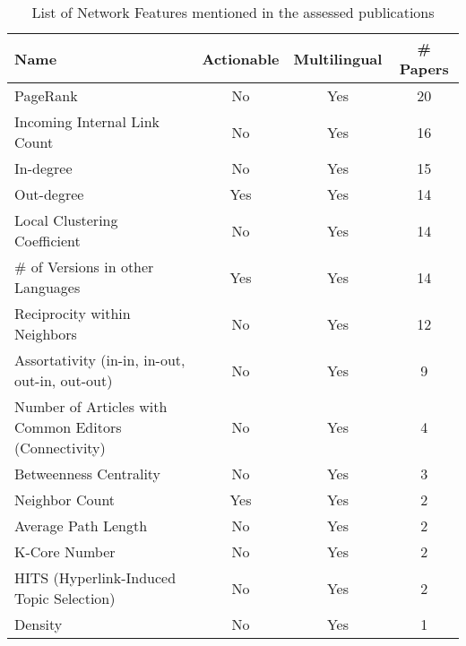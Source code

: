 \begin{table}[htbp]
    \caption{List of Network Features mentioned in the assessed publications}
    \label{tab:feat_Network}
    \centering
    \begin{tabular}{m{} c c c}
        \toprule
        \textbf{Name} & \textbf{Actionable} & \textbf{Multilingual} & \textbf{\# Papers} \\ 
        \midrule
        PageRank & No & Yes & 20 \\
        Incoming Internal Link Count & No & Yes & 16 \\
        In-degree & No & Yes & 15 \\
        Out-degree & Yes & Yes & 14 \\
        Local Clustering Coefficient & No & Yes & 14 \\
        \# of Versions in other Languages & Yes & Yes & 14 \\
        Reciprocity within Neighbors & No & Yes & 12 \\
        Assortativity (in-in, in-out, out-in, out-out) & No & Yes & 9 \\
        Number of Articles with Common Editors (Connectivity) & No & Yes & 4 \\
        Betweenness Centrality & No & Yes & 3 \\
        Neighbor Count & Yes & Yes & 2 \\
        Average Path Length & No & Yes & 2 \\
        K-Core Number & No & Yes & 2 \\
        HITS (Hyperlink-Induced Topic Selection) & No & Yes & 2 \\
        Density & No & Yes & 1 \\
        \bottomrule
    \end{tabular}
\end{table}